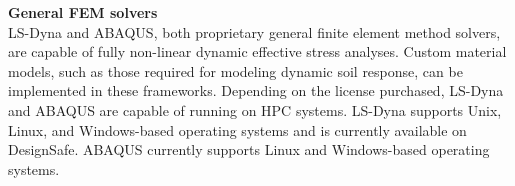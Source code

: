\noindent\textbf{General FEM solvers}\\
LS-Dyna and ABAQUS, both proprietary general finite element method solvers, are capable of fully non-linear dynamic effective stress analyses. Custom material models, such as those required for modeling dynamic soil response, can be implemented in these frameworks. Depending on the license purchased, LS-Dyna and ABAQUS are capable of running on HPC systems. LS-Dyna supports Unix, Linux, and Windows-based operating systems and is currently available on DesignSafe. ABAQUS currently supports Linux and Windows-based operating systems.\\





%
